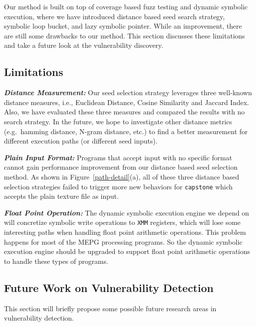 Our method is built on top of coverage based fuzz testing and dynamic symbolic execution, where we have introduced distance based seed search strategy, symbolic loop bucket, and lazy symbolic pointer.
 While an improvement, there are still some drawbacks to our method. This section discusses these limitations and take a future look at the vulnerability discovery.
 
\subsection{Limitations}

\noindent\textit{\textbf{Distance Measurement:}} Our seed selection strategy leverages three well-known distance measures, i.e., Euclidean Distance, Cosine Similarity and Jaccard Index. Also, we have evaluated these three measures and compared the results with no search strategy. In the future, we hope to investigate other distance metrics (e.g.\ hamming distance, N-gram distance, etc.) to find a better measurement for different execution paths (or different seed inputs). 

\noindent\textit{\textbf{Plain Input Format:}} Programs that accept input with no specific format cannot gain performance improvement from our distance based seed selection method.
 As shown in Figure~\ref{path-detail}(a), all of these three distance based selection strategies failed to trigger more new behaviors for \texttt{capstone} which accepts the plain texture file as input. 

\noindent\textit{\textbf{Float Point Operation:}} The dynamic symbolic execution engine we depend on will concretize symbolic write operations to \texttt{XMM} registers, which will lose some interesting paths when handling float point arithmetic operations. This problem happens for most of the MEPG processing programs. So the dynamic symbolic execution engine should be upgraded to support float point arithmetic operations to handle these types of programs.

\subsection{Future Work on Vulnerability Detection}
This section will briefly propose some possible future research areas in vulnerability detection.

